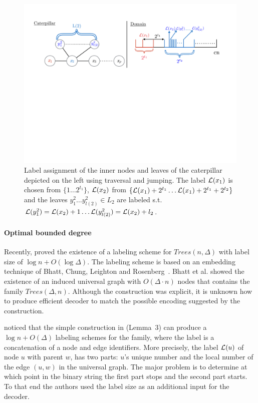 				\begin{figure} 
				\centering
				\includegraphics[width=120mm]{./Figures/Caterpillars.pdf}
				\caption{Label assignment of the inner nodes and leaves of the caterpillar depicted on the left using traversal and jumping. 
				The label  $ \mathcal{L}(x_1)$ is chosen from $\{1 \dots 2^{t_1} \}$,  $ \mathcal{L}(x_2)$ from $\{ \mathcal{L}(x_1)+2^{t_1} \dots \mathcal{L}(x_1)+2^{t_1}+2^{t_2} \}$ and the  leaves $y_1^2 \dots y^2_{l(2)} \in  L_2$ are labeled s.t.  $ \mathcal{L}(y_1^2) =  \mathcal{L}(x_2)+1 \dots   \mathcal{L}(y^2_{l(2)}) =  \mathcal{L}(x_2)+ l_2$.}
				\label{fig:caterpillar}
			\end{figure}


\paragraph{Optimal bounded degree}		
		Recently,  proved the existence of a labeling scheme for  $Trees(n, \Delta)$ with label size of  $\log n+O(\log \Delta)$.
		The labeling scheme is based  on an embedding technique of Bhatt, Chung, Leighton and Rosenberg~.
		Bhatt et al.  showed the existence of an induced universal graph with   $O( \Delta \cdot  n)$  nodes that contains the family $Trees(\Delta,n)$. Although the construction was explicit, it is unknown how to produce efficient  decoder to match the possible encoding suggested by the construction.
		
		  noticed that the simple construction in \cite{BCLR} (Lemma~3)  can produce a $\log n +O(\Delta)$ labeling schemes for the family, where the label is a concatenation of a node and edge identifiers.
		 More precisely, the label $ \mathcal{L}(u)$  of node $u$ with parent $w$, has two parts: $u$'s unique number and the  local number of the edge $(u,w)$ in the universal graph.
		 The major problem is to determine at which point in the binary  string the first part  stops and the second part starts. To that end the authors used the label size as an additional input for the decoder.

